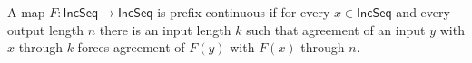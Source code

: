 \begin{definition}
A map $F:\mathsf{IncSeq}\to\mathsf{IncSeq}$ is prefix-continuous if for
every $x\in\mathsf{IncSeq}$ and every output length $n$ there is an input
length $k$ such that agreement of an input $y$ with $x$ through $k$ forces
agreement of $F(y)$ with $F(x)$ through $n$.
\end{definition}
